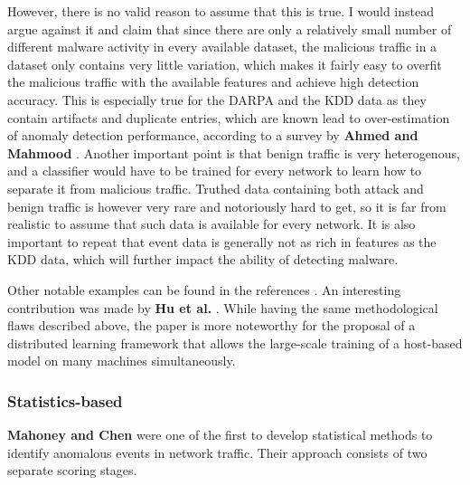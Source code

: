 \documentclass[a4paper,12pt,twoside]{report}
\begin{document}
However, there is no valid reason to assume that this is true. I would instead argue against it and claim that since there are only a relatively small number of different malware activity in every available dataset, the malicious traffic in a dataset only contains very little variation, which makes it fairly easy to overfit the malicious traffic with the available features and achieve high detection accuracy. %
This is especially true for the DARPA and the KDD data as they contain artifacts and  duplicate entries, which are known lead to over-estimation of anomaly detection performance, according to a survey by \textbf{Ahmed and Mahmood} \cite{ahmed2016survey}. Another important point is that benign traffic is very heterogenous, and a classifier would have to be trained for every network to learn how to separate it from malicious traffic. Truthed data containing both attack and benign traffic is however very rare and notoriously hard to get, so it is far from realistic to assume that such data is available for every network. It is also important to repeat that event data is generally not as rich in features as the KDD data, which will further impact the ability of detecting malware. 


Other notable examples can be found in the references \cite{gupta_layered_2010,muda_intrusion_2011,maglaras_intrusion_2014,
peddabachigari_intrusion_nodate,ramos_antids_2005}.
An interesting contribution was made by \textbf{Hu et al.} \cite{hu2014online}. While having the same methodological flaws described above, the paper is more noteworthy for the proposal of a distributed learning framework that allows the large-scale training of a host-based model on many machines simultaneously.


\subsubsection{Statistics-based}


\textbf{Mahoney and Chen} \cite{mahoney2002learning} were one of the first to develop statistical methods to identify anomalous events in network traffic. Their approach consists of two separate scoring stages.
\end{document}
